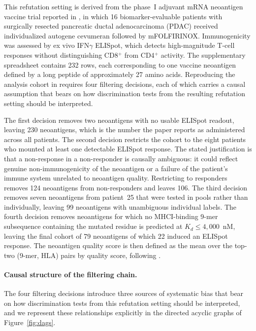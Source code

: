 \documentclass[11pt]{article}
\begin{document}
This refutation setting is derived from the phase~I adjuvant
mRNA neoantigen vaccine trial reported in \citet{rojas2023personalized},
in which 16 biomarker-evaluable patients with surgically
resected pancreatic ductal adenocarcinoma (PDAC) received
individualized autogene cevumeran followed by mFOLFIRINOX.
Immunogenicity was assessed by ex vivo IFN$\gamma$ ELISpot,
which detects high-magnitude T-cell responses without
distinguishing CD8$^{+}$ from CD4$^{+}$ activity.
The supplementary spreadsheet contains 232 rows, each
corresponding to one vaccine neoantigen defined by a long
peptide of approximately 27 amino acids.
Reproducing the analysis cohort in \citep{rojas2023personalized} requires
four filtering decisions, each of which carries a causal
assumption that bears on how discrimination tests from the
resulting refutation setting should be interpreted.

The first decision removes two neoantigens with no usable
ELISpot readout, leaving 230 neoantigens, which is the number
the paper reports as administered across all patients.
The second decision restricts the cohort to the eight patients
who mounted at least one detectable ELISpot response.
The stated justification is that a non-response in a
non-responder is causally ambiguous: it could reflect genuine
non-immunogenicity of the neoantigen or a failure of the
patient's immune system unrelated to neoantigen quality.
Restricting to responders removes 124 neoantigens from
non-responders and leaves 106.
The third decision removes seven neoantigens from patient~25
that were tested in pools rather than individually, leaving 99
neoantigens with unambiguous individual labels.
The fourth decision removes neoantigens for which no
MHCI-binding 9-mer subsequence containing the mutated residue
is predicted at $K_d \leq 4{,}000$~nM, leaving the final
cohort of 79 neoantigens of which 22 induced an ELISpot
response.
The neoantigen quality score is then defined as the mean over
the top-two (9-mer, HLA) pairs by quality score, following
\citep{rojas2023personalized}.

\paragraph{Causal structure of the filtering chain.}

The four filtering decisions introduce three sources of
systematic bias that bear on how discrimination tests from
this refutation setting should be interpreted, and we represent these
relationships explicitly in the directed acyclic graphs of
Figure~\ref{fig:dags}.
\end{document}
